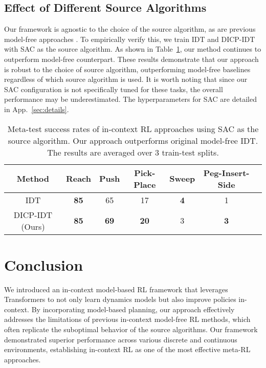 \documentclass{article}
\begin{document}
\subsection{Effect of Different Source Algorithms}
\label{sec:ablation:source}

Our framework is agnostic to the choice of the source algorithm, as are previous model-free approaches \citep{AD, DPT, IDT}.
To empirically verify this, we train IDT and DICP-IDT with SAC \citep{SAC} as the source algorithm.
As shown in Table~\ref{tab:ablation-source}, our method continues to outperform model-free counterpart.
These results demonstrate that our approach is robust to the choice of source algorithm, outperforming model-free baselines regardless of which source algorithm is used.
It is worth noting that since our SAC configuration is not specifically tuned for these tasks, the overall performance may be underestimated.
The hyperparameters for SAC are detailed in App.~\ref{sec:details}.


\begin{table}[t!]
    \caption{Meta-test success rates of in-context RL approaches using SAC as the source algorithm.
    Our approach outperforms original model-free IDT.
    The results are averaged over 3 train-test splits.
    }
    \label{tab:ablation-source}
    \small \centering
    \begin{tabular}{ccccccc}
    \toprule
    Method & Reach & Push & Pick-Place & Sweep & Peg-Insert-Side\\
    \midrule
    IDT & \textbf{85} & 65 & 17 & \textbf{4} & 1\\
    DICP-IDT (Ours) & \textbf{85} & \textbf{69} & \textbf{20} & 3 & \textbf{3}\\
    \bottomrule
    \end{tabular}
\end{table}

\section{Conclusion}
\label{sec:conc}

We introduced an in-context model-based RL framework that leverages Transformers to not only learn dynamics models but also improve policies in-context.
By incorporating model-based planning, our approach effectively addresses the limitations of previous in-context model-free RL methods, which often replicate the suboptimal behavior of the source algorithms.
Our framework demonstrated superior performance across various discrete and continuous environments, establishing in-context RL as one of the most effective meta-RL approaches.
\end{document}

